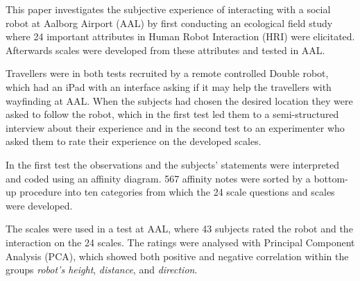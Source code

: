 \label{Abstract}
This paper investigates the subjective experience of interacting with a social robot at Aalborg Airport (AAL) by first conducting an ecological field study where 24 important attributes in Human Robot Interaction (HRI) were elicitated. Afterwards scales were developed from these attributes and tested in AAL. 

Travellers were in both tests recruited by a remote controlled Double robot, which had an iPad with an interface asking if it may help the travellers with wayfinding at AAL. When the subjects had chosen the desired location they were asked to follow the robot, which in the first test led them to a semi-structured interview about their experience and in the second test to an experimenter who asked them to rate their experience on the developed scales. 


In the first test the observations and the subjects' statements were interpreted and coded using an affinity diagram. 567 affinity notes were sorted by a bottom-up procedure into ten categories from which the 24 scale questions and scales were developed. 

The scales were used in a test at AAL, where 43 subjects rated the robot and the interaction on the 24 scales. The ratings were analysed with Principal Component Analysis (PCA), which showed both positive and negative correlation within the groups \textit{robot's height}, \textit{distance}, and \textit{direction}. 


%
%



